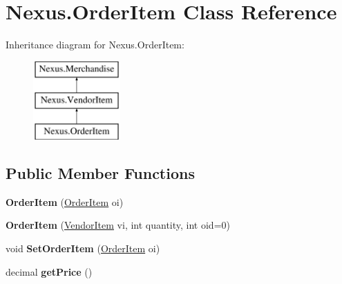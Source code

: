 \hypertarget{class_nexus_1_1_order_item}{}\section{Nexus.\+Order\+Item Class Reference}
\label{class_nexus_1_1_order_item}
Inheritance diagram for Nexus.\+Order\+Item\+:\begin{figure}[H]
\begin{center}
\leavevmode
\includegraphics[height=3.000000cm]{class_nexus_1_1_order_item}
\end{center}
\end{figure}
\subsection*{Public Member Functions}
\begin{DoxyCompactItemize}
\item 
\mbox{\label{class_nexus_1_1_order_item_ac0bd7c8ad6758642044e412e0de45b63}} 
{\bfseries Order\+Item} (\mbox{\hyperlink{class_nexus_1_1_order_item}{Order\+Item}} oi)
\item 
\mbox{\label{class_nexus_1_1_order_item_a783b004782a4af09d4301bfe50d407f7}} 
{\bfseries Order\+Item} (\mbox{\hyperlink{class_nexus_1_1_vendor_item}{Vendor\+Item}} vi, int quantity, int oid=0)
\item 
\mbox{\label{class_nexus_1_1_order_item_a9c59d7c26cbae62a63369ca565faea05}} 
void {\bfseries Set\+Order\+Item} (\mbox{\hyperlink{class_nexus_1_1_order_item}{Order\+Item}} oi)
\item 
\mbox{\label{class_nexus_1_1_order_item_a89f5208959b73aefed1a8177277d4832}} 
decimal {\bfseries get\+Price} ()
\end{DoxyCompactItemize}
